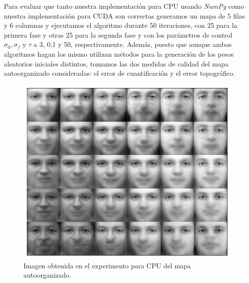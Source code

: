 Para evaluar que tanto nuestra implementación para CPU usando \textit{NumPy} como nuestra implementación para CUDA son correctas generamos un mapa de 5 filas y 6 columnas y ejecutamos el algoritmo durante 50 iteraciones, con 25 para la primera fase y otras 25 para la segunda fase y con los parámetros de control $\sigma_0, \sigma_f$ y $\tau$ a 3, 0,1 y 50, respectivamente. Además, puesto que aunque ambos algoritmos hagan los mismo utilizan métodos para la generación de los pesos aleatorios iniciales distintos, tomamos las dos medidas de calidad del mapa autoorganizado consideradas: el error de cuantificación y el error topográfico.\\

\begin{figure}[ht]
\centering
\includegraphics[scale=0.3]{imagenes/facescpu.png}
\caption{Imagen obtenida en el experimento para CPU del mapa autoorganizado.}
\label{img:somcpu}
\end{figure}

